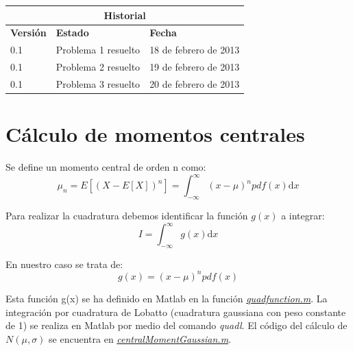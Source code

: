 \documentclass[a4paper,11pt]{article}
\begin{document}
\vspace{2cm}
\begin{center}
\begin{tabular}{|p{2.5cm}|p{3.5cm}|p{3.5cm}|}
\hline
\multicolumn{3}{|c|}{\textbf{Historial}}\\
\hline
\hline
\textbf{Versi\'on} & \textbf{Estado} & \textbf{Fecha}\\
\hline
0.1 & Problema 1 resuelto & 18 de febrero de 2013\\
\hline
0.1 & Problema 2 resuelto & 19 de febrero de 2013\\
\hline
0.1 & Problema 3 resuelto & 20 de febrero de 2013\\
\hline
\end{tabular}
\end{center}

\pagebreak

\setcounter{page}{1}
\pagebreak

\setcounter{tocdepth}{3}
\tableofcontents
\pagebreak
\listoftables
\listoffigures
\lstlistoflistings
\pagebreak

\setcounter{page}{1}

\pagebreak
\section{C\'alculo de momentos centrales}

Se define un momento central de orden n como:\\
\begin{equation*}
   \mu_n = E [(X- E[X])^n] = \int_{-\infty}^\infty (x - \mu)^n pdf(x)\mathrm{d}x
\end{equation*}

Para realizar la cuadratura debemos identificar la funci\'on $g(x)$ a
integrar:\\
\begin{equation*}
   I = \int_{-\infty}^\infty g(x)\mathrm{d}x
\end{equation*}

En nuestro caso se trata de:\\
\begin{equation*}
   g(x) = (x - \mu)^n pdf(x)
\end{equation*}

Esta funci\'on g(x) se ha definido en Matlab en la funci\'on
\hyperref[quadfunc]{\textit{quadfunction.m}}. La integraci\'on por cuadratura de
Lobatto (cuadratura gaussiana con peso constante de 1) se realiza en Matlab por
medio del comando \textit{quadl}. El c\'odigo del c\'alculo de
$N(\mu, \sigma)$ se encuentra en
\hyperref[centralMomentQuad]{\textit{centralMomentGaussian.m}}.
\end{document}
